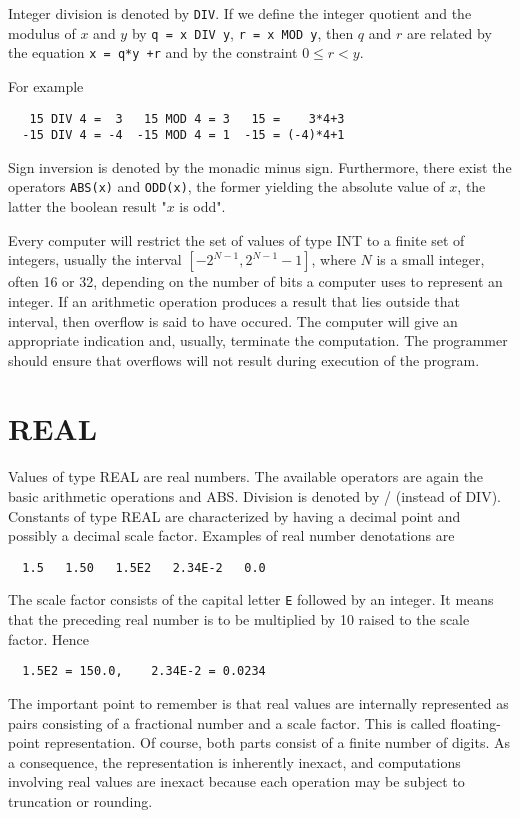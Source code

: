 Integer division is denoted by \verb|DIV|. If we define the integer quotient and the modulus of $x$
and $y$ by \verb|q = x DIV y|, \verb|r = x MOD y|, then $q$ and $r$ are related by the equation
\verb|x = q*y +r| and by the constraint $0 \le r < y$.

For example
\begin{verbatim}
   15 DIV 4 =  3   15 MOD 4 = 3   15 =    3*4+3
  -15 DIV 4 = -4  -15 MOD 4 = 1  -15 = (-4)*4+1
\end{verbatim}
Sign inversion is denoted by the monadic minus sign. Furthermore, there exist the operators
\verb|ABS(x)| and \verb|ODD(x)|, the former yielding the absolute value of $x$, the latter
the boolean result "$x$ is odd".

Every computer will restrict the set of values of type INT to a finite set of integers, usually the
interval $[-2^{N-1}, 2^{N-1}-1]$, where $N$ is a small integer, often 16 or 32, depending on the
number of bits a computer uses to represent an integer. If an arithmetic operation produces a result
that lies outside that interval, then overflow is said to have occured. The computer will give an
appropriate indication and, usually, terminate the computation. The programmer should ensure that
overflows will not result during execution of the program.

\section{REAL}
Values of type REAL are real numbers. The available operators are again the basic arithmetic
operations and ABS. Division is denoted by / (instead of DIV). Constants of type REAL are
characterized by having a decimal point and possibly a decimal scale factor. Examples of real
number denotations are
\begin{verbatim}
  1.5   1.50   1.5E2   2.34E-2   0.0
\end{verbatim}
The scale factor consists of the capital letter \verb|E| followed by an integer. It means that the
preceding real number is to be multiplied by 10 raised to the scale factor. Hence
\begin{verbatim}
  1.5E2 = 150.0,    2.34E-2 = 0.0234
\end{verbatim}
The important point to remember is that real values are internally represented as pairs consisting of
a fractional number and a scale factor. This is called floating-point representation. Of course, both
parts consist of a finite number of digits. As a consequence, the representation is inherently inexact,
and computations involving real values are inexact because each operation may be subject to
truncation or rounding.

